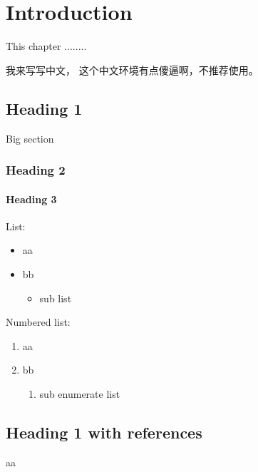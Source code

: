 \chapter{Introduction}
This chapter ........
\begin{CJK}{UTF8}{song}
	我来写写中文， 这个中文环境有点傻逼啊，不推荐使用。
\end{CJK}

\section{Heading 1}
Big section
\subsection{Heading 2}
\subsubsection{Heading 3}
List:
\begin{itemize}
	\item aa
	\item bb
	\begin{itemize}
		\item sub list
	\end{itemize}
\end{itemize}
Numbered list:
\begin{enumerate}
	\item aa
	\item bb
	\begin{enumerate}
		\item sub enumerate list
	\end{enumerate}
\end{enumerate}
\section{Heading 1 with references}
aa \cite{GaborHolography}\cite{KimSingleChipFPGA}